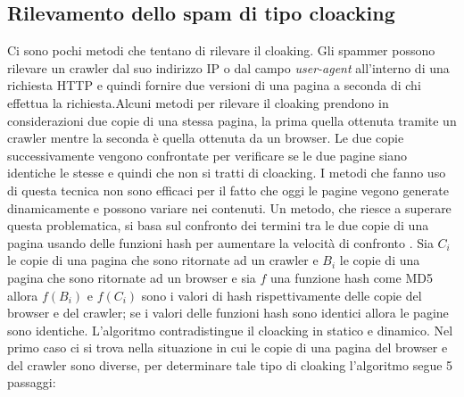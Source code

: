 \subsection{Rilevamento dello spam di tipo cloacking}
Ci sono pochi metodi che tentano di rilevare il cloaking. Gli spammer possono rilevare un crawler dal suo indirizzo IP o dal campo \textit{user-agent} all'interno di una richiesta HTTP e quindi fornire due versioni di una pagina a seconda di chi effettua la richiesta.Alcuni metodi per rilevare il cloaking prendono in considerazioni due copie di una stessa pagina, la prima  quella ottenuta tramite un crawler mentre la seconda è quella ottenuta da un browser. Le due copie successivamente vengono confrontate per verificare se le due pagine siano identiche le stesse e quindi che non si tratti di cloacking. I metodi che fanno uso di questa tecnica non sono efficaci per il fatto che oggi le pagine vegono generate dinamicamente e possono variare nei contenuti. Un metodo, che riesce a superare questa problematica, si basa sul confronto dei termini tra le due copie di una pagina usando delle funzioni hash per aumentare la velocità di confronto \cite{Ghiam:2013cloaking}. Sia \(C_i\) le copie di una pagina che sono ritornate ad un crawler e \(B_i\) le copie di una pagina che sono ritornate ad un browser e sia \(f\) una funzione hash come MD5 allora \(f(B_i)\) e \(f(C_i)\) sono i valori di hash rispettivamente delle copie del browser e del crawler; se i valori delle funzioni hash sono identici allora le pagine sono identiche. L'algoritmo contradistingue il cloacking in statico e dinamico. Nel primo caso ci si trova nella situazione in cui le copie di una pagina del browser e del crawler sono diverse, per determinare tale tipo di cloaking l'algoritmo segue 5 passaggi:
